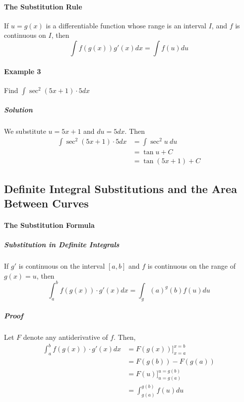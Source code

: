 \documentclass{article}
\begin{document}
            \paragraph{The Substitution Rule} If $u=g(x)$ is a differentiable function whose range is an interval $I$, and $f$ is continuous on $I$, then
            \[\int f(g(x))g'(x)dx=\int f(u)du\]
            \paragraph{Example 3} Find $\int \sec^2(5x+1)\cdot 5dx$
                \subparagraph{Solution} We substitute $u=5x+1$ and $du=5dx$. Then
                \begin{equation}
                    \begin{aligned}
                        \int \sec^2(5x+1)\cdot 5 dx&=\int \sec ^2u\ du\\
                        &=\tan u+C\\
                        &=\tan(5x+1)+C
                    \end{aligned}
                \end{equation}
        \subsection{Definite Integral Substitutions and the Area Between Curves}
            \paragraph{The Substitution Formula}
                \subparagraph{Substitution in Definite Integrals} If $g'$ is continuous on the interval $[a,b]$ and $f$ is continuous on the range of $g(x)=u$, then
                \[\int_a^bf(g(x))\cdot g'(x)dx=\int_g(a)^g(b)f(u)du\]
                \subparagraph{Proof} Let $F$ denote any antiderivative of $f$. Then,
                \begin{equation}
                    \begin{aligned}
                        \int_a^bf(g(x))\cdot g'(x)dx&=F(g(x))\Bigg ]_{x=a}^{x=b}\\
                        &=F(g(b))-F(g(a))\\
                        &=F(u)\Bigg ]_{u=g(a)}^{u=g(b)}\\
                        &=\int_{g(a)}^{g(b)}f(u)du\\
                    \end{aligned}
                \end{equation}
\end{document}
